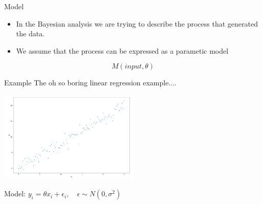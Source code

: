 \documentclass[12pt, aspectratio=149]{beamer}
\theoremstyle{plain}
\begin{document}
\begin{frame}[fragile]{Model}
	\begin{itemize}
		\item In the Bayesian analysis we are trying to describe the process that generated the data. 
		\item We assume that the process can be expressed as a parametic model
	\end{itemize}
	\begin{equation*}
		M(input, \theta)
	\end{equation*}
\end{frame}

\begin{frame}[fragile]{Example}
The oh so boring linear regression example....
\begin{center}
\includegraphics[width=0.5\textwidth]{figs/linreg_example.png}
\end{center}
Model:  \quad \quad  $ y_i = \theta  x_i + \epsilon_i, \quad \epsilon \sim N(0, \sigma^2)$
\end{frame}
\end{document}
